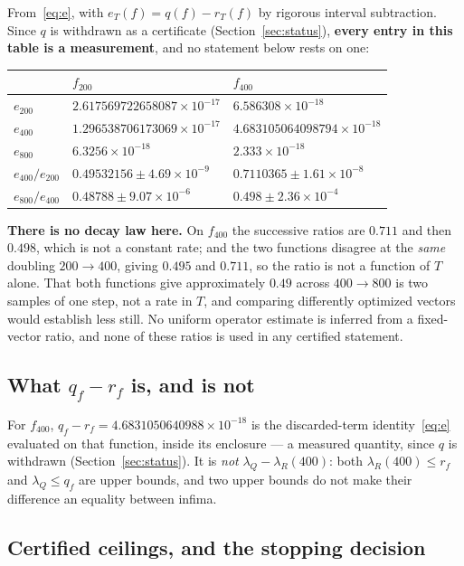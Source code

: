 \documentclass[11pt,a4paper]{article}
\theoremstyle{definition}
\theoremstyle{remark}
\newcommand{\lQ}{\lambda_{Q}}
\newcommand{\lR}{\lambda_{R}}
\begin{document}
From~\eqref{eq:e}, with $e_T(f) = q(f) - r_T(f)$ by rigorous interval
subtraction. Since $q$ is withdrawn as a certificate
(Section~\ref{sec:status}), \textbf{every entry in this table is a measurement},
and no statement below rests on one:
\begin{center}
\begin{tabular}{lll}
\toprule
 & $f_{200}$ & $f_{400}$ \\
\midrule
$e_{200}$ & $2.617569722658087\times10^{-17}$ & $6.586308\times10^{-18}$ \\
$e_{400}$ & $1.296538706173069\times10^{-17}$ & $4.683105064098794\times10^{-18}$ \\
$e_{800}$ & $6.3256\times10^{-18}$            & $2.333\times10^{-18}$ \\
\midrule
$e_{400}/e_{200}$ & $0.49532156 \pm 4.69\times10^{-9}$ & $0.7110365 \pm 1.61\times10^{-8}$ \\
$e_{800}/e_{400}$ & $0.48788 \pm 9.07\times10^{-6}$    & $0.498 \pm 2.36\times10^{-4}$ \\
\bottomrule
\end{tabular}
\end{center}

\textbf{There is no decay law here.} On $f_{400}$ the successive ratios are
$0.711$ and then $0.498$, which is not a constant rate; and the two functions
disagree at the \emph{same} doubling $200 \to 400$, giving $0.495$ and $0.711$,
so the ratio is not a function of $T$ alone. That both functions give
approximately $0.49$ across $400 \to 800$ is two samples of one step, not a rate
in $T$, and comparing differently optimized vectors would establish less still.
No uniform operator estimate is inferred from a fixed-vector ratio, and none of
these ratios is used in any certified statement.

\subsection{What $q_f - r_f$ is, and is not}

For $f_{400}$, $q_f - r_f = 4.6831050640988\times10^{-18}$ is the
discarded-term identity~\eqref{eq:e} evaluated on that function, inside its
enclosure --- a measured quantity, since $q$ is withdrawn
(Section~\ref{sec:status}). It is \emph{not} $\lQ - \lR(400)$: both $\lR(400) \le r_f$
and $\lQ \le q_f$ are upper bounds, and two upper bounds do not make their
difference an equality between infima.

\subsection{Certified ceilings, and the stopping decision}
\end{document}

